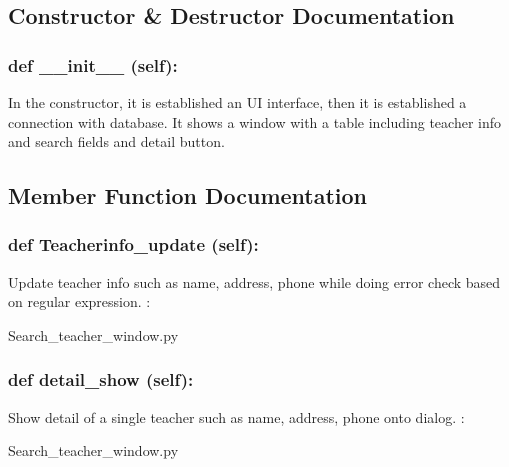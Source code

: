 \subsection{Constructor \& Destructor Documentation}
\hypertarget{class_poly_aa3def076b74bed67904976ad4f9fe9b1}{
\subsubsection[{def __init__ (self):}]{\setlength{\rightskip}{0pt plus 5cm}def {\_\_init\_\_} (self): 
}}
In the constructor, it is established an UI interface, then it is  established a connection with database. It shows a window with a table including teacher info and search fields and detail button. 
 

\subsection{Member Function Documentation}

\hypertarget{class_poly_a14a7ad77ce612b0c54f531d307ee4b39}{
\subsubsection[{def Teacherinfo_update (self):}]{\setlength{\rightskip}{0pt plus 5cm}def {Teacherinfo\_update} (self):}}\label{class_poly_a14a7ad77ce612b0c54f531d307ee4b39}
Update teacher info such as name, address, phone while doing error check based on regular expression. 
:\begin{DoxyCompactItemize}
\item 
Search\_teacher\_window.\-py\end{DoxyCompactItemize}

\hypertarget{class_poly_a14a7ad77ce612b0c54f531d307ee4b39}{
\subsubsection[{def detail_show (self):}]{\setlength{\rightskip}{0pt plus 5cm}def {detail\_show} (self):}}\label{class_poly_a14a7ad77ce612b0c54f531d307ee4b39}
Show detail of a single teacher such as name, address, phone onto dialog.
:\begin{DoxyCompactItemize}
\item 
Search\_teacher\_window.\-py\end{DoxyCompactItemize}

